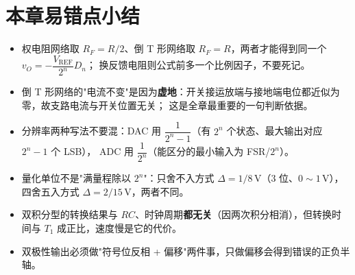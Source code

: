 \section{本章易错点小结}
\begin{itemize}
    \item 权电阻网络取 $R_F=R/2$、倒 T 形网络取 $R_F=R$，两者才能得到同一个 $v_O=-\dfrac{V_\text{REF}}{2^n}D_n$；
    换反馈电阻则公式前多一个比例因子，不要死记。
    \item 倒 T 形网络的"电流不变"是因为\textbf{虚地}：开关接运放端与接地端电位都近似为零，故支路电流与开关位置无关；
    这是全章最重要的一句判断依据。
    \item 分辨率两种写法不要混：DAC 用 $\dfrac{1}{2^n-1}$（有 $2^n$ 个状态、最大输出对应 $2^n-1$ 个 LSB），
    ADC 用 $\dfrac{1}{2^n}$（能区分的最小输入为 FSR/$2^n$）。
    \item 量化单位不是"满量程除以 $2^n$"：只舍不入方式 $\Delta=1/8\,\mathrm{V}$（3 位、$0\sim1\,\mathrm{V}$），
    四舍五入方式 $\Delta=2/15\,\mathrm{V}$，两者不同。
    \item 双积分型的转换结果与 $RC$、时钟周期\textbf{都无关}（因两次积分相消），但转换时间与 $T_1$ 成正比，速度慢是它的代价。
    \item 双极性输出必须做"符号位反相 + 偏移"两件事，只做偏移会得到错误的正负半轴。
\end{itemize}
